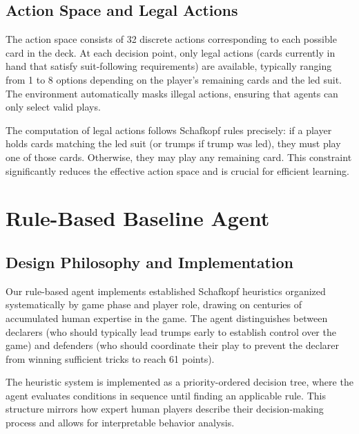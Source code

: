 \documentclass[conference]{IEEEtran}
\begin{document}
\subsection{Action Space and Legal Actions}

The action space consists of 32 discrete actions corresponding to each possible card in the deck. At each decision point, only legal actions (cards currently in hand that satisfy suit-following requirements) are available, typically ranging from 1 to 8 options depending on the player's remaining cards and the led suit. The environment automatically masks illegal actions, ensuring that agents can only select valid plays.

The computation of legal actions follows Schafkopf rules precisely: if a player holds cards matching the led suit (or trumps if trump was led), they must play one of those cards. Otherwise, they may play any remaining card. This constraint significantly reduces the effective action space and is crucial for efficient learning.

\section{Rule-Based Baseline Agent}

\subsection{Design Philosophy and Implementation}

Our rule-based agent implements established Schafkopf heuristics organized systematically by game phase and player role, drawing on centuries of accumulated human expertise in the game. The agent distinguishes between declarers (who should typically lead trumps early to establish control over the game) and defenders (who should coordinate their play to prevent the declarer from winning sufficient tricks to reach 61 points).

The heuristic system is implemented as a priority-ordered decision tree, where the agent evaluates conditions in sequence until finding an applicable rule. This structure mirrors how expert human players describe their decision-making process and allows for interpretable behavior analysis.
\end{document}
